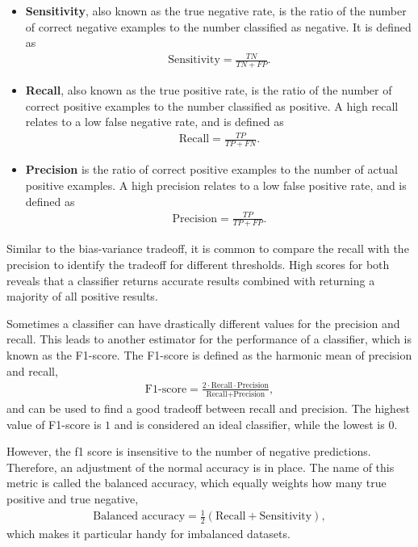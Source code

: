 \begin{itemize}
\item \textbf{Sensitivity}, also known as the true negative rate, is the ratio of the number of correct negative examples to the number classified as negative. It is defined as
\begin{align}
\text{Sensitivity} = \frac{TN}{TN + FP}.
\end{align}

\item \textbf{Recall}, also known as the true positive rate, is the ratio of the number of correct positive examples to the number classified as positive. A high recall relates to a low false negative rate, and is defined as
\begin{align}
\text{Recall} = \frac{TP}{TP + FN}.
\end{align}

\item \textbf{Precision} is the ratio of correct positive examples to the number of actual positive examples. A high precision relates to a low false positive rate, and is defined as  \\
\begin{align}
\text{Precision} = \frac{TP}{TP + FP}.
\end{align}
\end{itemize} Similar to the bias-variance tradeoff, it is common to compare the recall with the precision to identify the tradeoff for different thresholds. High scores for both reveals that a classifier returns accurate results combined with returning a majority of all positive results.


Sometimes a classifier can have drastically different values for the precision and recall. This leads to another estimator for the performance of a classifier, which is known as the F1-score. The F1-score is defined as the harmonic mean of precision and recall,
\begin{align*}
\text{F1-score} = \frac{2\cdot \text{Recall} \cdot \text{Precision}}{\text{Recall} + \text{Precision}},
\end{align*}
and can be used to find a good tradeoff between recall and precision. The highest value of F1-score is $1$ and is considered an ideal classifier, while the lowest is $0$.

However, the f1 score is insensitive to the number of negative predictions. Therefore, an adjustment of the normal accuracy is in place. The name of this metric is called the balanced accuracy, which equally weights how many true positive and true negative,
\begin{align*}
  \text{Balanced accuracy} = \frac{1}{2} \left( \text{Recall} + \text{Sensitivity} \right),
\end{align*}
which makes it particular handy for imbalanced datasets.

